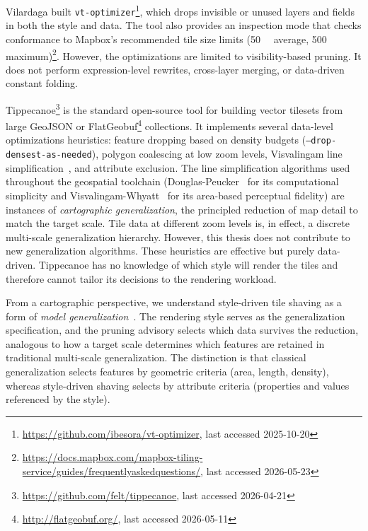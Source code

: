 Vilardaga built \texttt{vt-optimizer}\footnote{\url{https://github.com/ibesora/vt-optimizer}, last accessed 2025-10-20}, which drops invisible or unused layers and fields in both the style and data.
The tool also provides an inspection mode that checks conformance to Mapbox's recommended tile size limits (\qty{50}{\kilo\byte} average, \qty{500}{\kilo\byte} maximum)\footnote{\url{https://docs.mapbox.com/mapbox-tiling-service/guides/frequentlyaskedquestions/}, last accessed 2026-05-23}.
However, the optimizations are limited to visibility-based pruning.
It does not perform expression-level rewrites, cross-layer merging, or data-driven constant folding.

Tippecanoe\footnote{\url{https://github.com/felt/tippecanoe}, last accessed 2026-04-21} is the standard open-source tool for building vector tilesets from large \ac{GeoJSON} or FlatGeobuf\footnote{\url{http://flatgeobuf.org/}, last accessed 2026-05-11} collections.
It implements several data-level optimizations heuristics: feature dropping based on density budgets (\texttt{--drop-densest-as-needed}), polygon coalescing at low zoom levels, Visvalingam line simplification~\cite{visvalingamLineGeneralisationRepeated1993}, and attribute exclusion.
The line simplification algorithms used throughout the geospatial toolchain (Douglas-Peucker~\cite{douglasALGORITHMSREDUCTIONNUMBER1973} for its computational simplicity and Visvalingam-Whyatt~\cite{visvalingamLineGeneralisationRepeated1993} for its area-based perceptual fidelity) are instances of \emph{cartographic generalization}, the principled reduction of map detail to match the target scale.
Tile data at different zoom levels is, in effect, a discrete multi-scale generalization hierarchy.
However, this thesis does not contribute to new generalization algorithms.
These heuristics are effective but purely data-driven.
Tippecanoe has no knowledge of which style will render the tiles and therefore cannot tailor its decisions to the rendering workload.

From a cartographic perspective, we understand style-driven tile shaving as a form of \emph{model generalization}~\cite{mcmasterGeneralizationDigitalCartography1992}.
The rendering style serves as the generalization specification, and the pruning advisory selects which data survives the reduction, analogous to how a target scale determines which features are retained in traditional multi-scale generalization.
The distinction is that classical generalization selects features by geometric criteria (area, length, density), whereas style-driven shaving selects by attribute criteria (properties and values referenced by the style).

